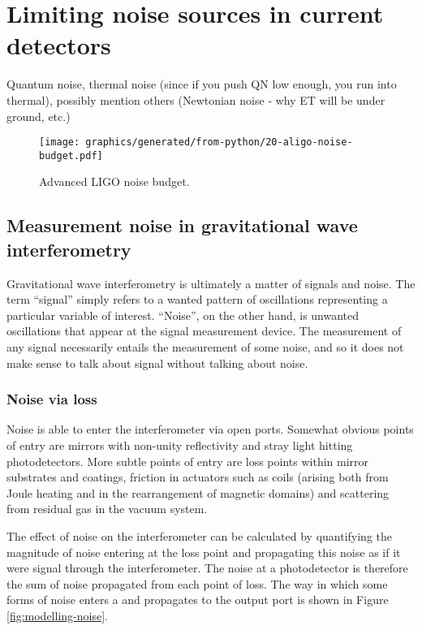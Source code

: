 \section{Limiting noise sources in current detectors}
Quantum noise, thermal noise (since if you push QN low enough, you run into thermal), possibly mention others (Newtonian noise - why ET will be under ground, etc.)

\begin{figure}
  \centering
  \texttt{[image: graphics/generated/from-python/20-aligo-noise-budget.pdf]}
  \caption[Advanced LIGO noise budget]{\label{fig:aligo-noise-budget}Advanced LIGO noise budget.}
\end{figure}

\subsection{Measurement noise in gravitational wave interferometry}
Gravitational wave interferometry is ultimately a matter of signals and noise. The term ``signal'' simply refers to a wanted pattern of oscillations representing a particular variable of interest. ``Noise'', on the other hand, is unwanted oscillations that appear at the signal measurement device. The measurement of any signal necessarily entails the measurement of some noise, and so it does not make sense to talk about signal without talking about noise.

\subsubsection{\label{eq:noise-via-loss}Noise via loss}
Noise is able to enter the interferometer via open ports. Somewhat obvious points of entry are mirrors with non-unity reflectivity and stray light hitting photodetectors. More subtle points of entry are loss points within mirror substrates and coatings, friction in actuators such as coils (arising both from Joule heating and in the rearrangement of magnetic domains) and scattering from residual gas in the vacuum system.

The effect of noise on the interferometer can be calculated by quantifying the magnitude of noise entering at the loss point and propagating this noise as if it were signal through the interferometer. The noise at a photodetector is therefore the sum of noise propagated from each point of loss. The way in which some forms of noise enters a \DRFPMI{} and propagates to the output port is shown in Figure\,\ref{fig:modelling-noise}.

